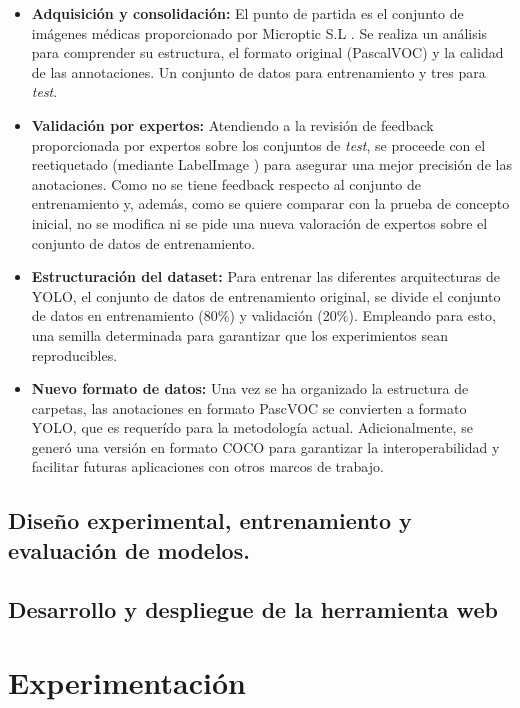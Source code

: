 \documentclass[12pt,a4paper,onecolumn,oneside]{report}
\begin{document}
\begin{itemize}
  \item \textbf{Adquisición y consolidación:} El punto de partida es el conjunto de imágenes médicas proporcionado por Microptic S.L \cite{microptic}. 
  Se realiza un análisis para comprender su estructura, el formato original (PascalVOC) y la calidad de las annotaciones. Un conjunto de datos para entrenamiento y tres para \textit{test}.
  \item \textbf{Validación por expertos:} Atendiendo a la revisión de feedback proporcionada por expertos sobre los conjuntos de \textit{test}, se proceede con el reetiquetado (mediante LabelImage \cite{labelimg_github}) para asegurar una mejor precisión de las anotaciones. 
  Como no se tiene feedback respecto al conjunto de entrenamiento y, además, como se quiere comparar con la prueba de concepto inicial, no se modifica ni se pide una nueva valoración de expertos sobre el conjunto de datos de entrenamiento.
  \item \textbf{Estructuración del dataset:} Para entrenar las diferentes arquitecturas de YOLO, el conjunto de datos de entrenamiento original, se divide el conjunto de datos en entrenamiento (80\%) y validación (20\%). Empleando para esto, una semilla determinada para garantizar que los experimientos sean reproducibles. 
  \item \textbf{Nuevo formato de datos:} Una vez se ha organizado la estructura de carpetas, las anotaciones en formato PascVOC se convierten a formato YOLO, que es requerído para la metodología actual. Adicionalmente, se generó una versión en formato COCO para garantizar la interoperabilidad y facilitar futuras aplicaciones con otros marcos de trabajo.
\end{itemize}

\section{Diseño experimental, entrenamiento y evaluación de modelos.}
\label{Entrenamiento, validación y evaluación de modelos YOLO}

\section{Desarrollo y despliegue de la herramienta web}
\label{Despliegue de la herramienta web}


\chapter{Experimentación} %
\label{Experimentación}
\end{document}
